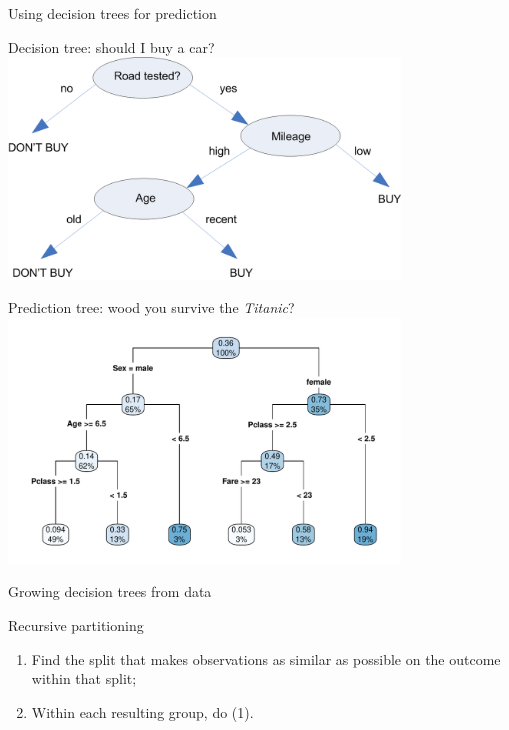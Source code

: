 \documentclass[xcolor=table,aspectratio=169]{beamer}
\begin{document}
\begin{frame}
	Using decision trees for prediction
\end{frame}


\begin{frame}{Decision tree: should I buy a car?}
	\includegraphics[width=0.78\textwidth]{pics/dectree}
\end{frame}

\begin{frame}{Prediction tree: wood you survive the \emph{Titanic}?}
	\includegraphics[width=0.78\textwidth]{pics/Titanic_tree}
\end{frame}

\begin{frame}
	Growing decision trees from data 
\end{frame}

\begin{frame}{Recursive partitioning}
	\begin{enumerate}
		\item Find the split that makes observations as similar as possible on the outcome within that split;
		\item Within each resulting group, do (1).
	\end{enumerate}
\end{frame}
\end{document}
